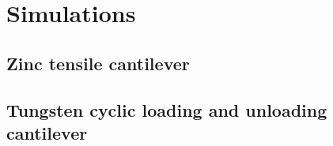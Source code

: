 \chapter{Simulations}\label{c:simulations}
\section{Zinc tensile cantilever}\label{s:zincTensile}
\section{Tungsten cyclic loading and unloading cantilever}\label{s:tungstenCyclic}
